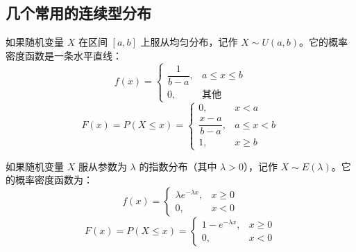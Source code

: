 \subsection{几个常用的连续型分布}
\begin{definition}[均匀分布]
如果随机变量 $X$ 在区间 $[a, b]$ 上服从均匀分布，记作 $X \sim U(a, b)$。它的概率密度函数是一条水平直线：
\begin{equation}
	f(x) = \begin{cases} \dfrac{1}{b - a}, & a \le x \le b \\[1ex] 0, & \text{其他} \end{cases}
	\label{eq:第二章:均匀密度}
\end{equation}
\begin{equation}
	F(x) = P(X \le x) = \begin{cases} 0, & x < a \\[1ex] \dfrac{x - a}{b - a}, & a \le x < b \\[1ex] 1, & x \ge b \end{cases}
	\label{eq:第二章:均匀分布函数}
\end{equation}
\end{definition}

\begin{definition}[指数分布]
如果随机变量 $X$ 服从参数为 $\lambda$ 的指数分布（其中 $\lambda > 0$），记作 $X \sim E(\lambda)$。它的概率密度函数为：
\begin{equation}
	f(x) = \begin{cases} \lambda e^{-\lambda x}, & x \ge 0 \\[1ex] 0, & x < 0 \end{cases}
	\label{eq:第二章:指数密度}
\end{equation}
\begin{equation}
	F(x) = P(X \le x) = \begin{cases} 1 - e^{-\lambda x}, & x \ge 0 \\[1ex] 0, & x < 0 \end{cases}
	\label{eq:第二章:指数分布函数}
\end{equation}
\end{definition}

